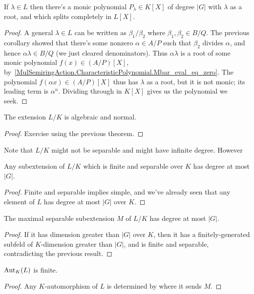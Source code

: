 \begin{theorem}
  \label{foo1}
If $\lambda\in L$ then there's a monic polynomial $P_\lambda\in K[X]$ of degree $|G|$
with $\lambda$ as a root, and which splits completely in $L[X]$.
\end{theorem}
\begin{proof}
  A general $\lambda\in L$ can be written as $\beta_1/\beta_2$ where $\beta_1,\beta_2\in B/Q$.
  The previous corollary showed that there's some nonzero $\alpha\in A/P$ such that $\beta_2$
  divides $\alpha$, and hence $\alpha\lambda\in B/Q$ (we just cleared denominators).
  Thus $\alpha\lambda$ is a root of some monic polynomial $f(x)\in (A/P)[X]$,
  by~\ref{MulSemiringAction.CharacteristicPolynomial.Mbar_eval_eq_zero}.
  The polynomial $f(\alpha x)\in (A/P)[X]$ thus
  has $\lambda$ as a root, but it is not monic; its leading term is $\alpha^n$.
  Dividing through in $K[X]$ gives us the polynomial we seek.
\end{proof}

\begin{corollary} The extension $L/K$ is algebraic and normal.
\end{corollary}
\begin{proof} 
  Exercise using the previous theorem.
\end{proof}

Note that $L/K$ might not be separable and might have infinite degree. However

\begin{corollary} Any subextension of $L/K$ which is finite and separable over $K$
  has degree at most $|G|$.
\end{corollary}
\begin{proof}
  Finite and separable implies simple, and we've already seen that any
  element of $L$ has degree at most $|G|$ over $K$.
\end{proof}

\begin{corollary} The maximal separable subextension $M$ of $L/K$ has degree at most $|G|$.
\end{corollary}
\begin{proof} If it has dimension greater than $|G|$ over $K$, then it has a finitely-generated
  subfeld of $K$-dimension greater than $|G|$, and is finite and separable, contradicting
  the previous result.
\end{proof}

\begin{corollary} $\operatorname{Aut}_K(L)$ is finite.
\end{corollary}
\begin{proof} Any $K$-automorphism of $L$ is determined by where it sends $M$.
\end{proof}


